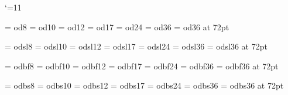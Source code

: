 

%

\catcode`\@=11




\font\od@VIII     = od8
\font\od@X        = od10
\font\od@XII      = od12
\font\od@XVII     = od17
\font\od@XXIV     = od24
\font\od@XXXVI    = od36
\font\od@LXXII    = od36 at 72pt

\font\odsl@VIII   = odsl8
\font\odsl@X      = odsl10
\font\odsl@XII    = odsl12
\font\odsl@XVII   = odsl17
\font\odsl@XXIV   = odsl24
\font\odsl@XXXVI  = odsl36
\font\odsl@LXXII  = odsl36 at 72pt

\font\odbf@VIII   = odbf8
\font\odbf@X      = odbf10
\font\odbf@XII    = odbf12
\font\odbf@XVII   = odbf17
\font\odbf@XXIV   = odbf24
\font\odbf@XXXVI  = odbf36
\font\odbf@LXXII  = odbf36 at 72pt

\font\odbs@VIII   = odbs8
\font\odbs@X      = odbs10
\font\odbs@XII    = odbs12
\font\odbs@XVII   = odbs17
\font\odbs@XXIV   = odbs24
\font\odbs@XXXVI  = odbs36
\font\odbs@LXXII  = odbs36 at 72pt

\def\odVIII{\od@VIII\baselineskip=9pt}
\def\od{\od@X\baselineskip=12pt}
\def\odXII{\od@XII\baselineskip=15pt}
\def\odXVII{\od@XVII\baselineskip=20pt}
\def\odXXIV{\od@XXIV\baselineskip=26pt}
\def\odXXXVI{\od@XXXVI\baselineskip=36pt}
\def\odLXXII{\od@LXXII\baselineskip=72pt}

\def\odslVIII{\odsl@VIII\baselineskip=9pt}
\def\odsl{\odsl@X\baselineskip=12pt}
\def\odslXII{\odsl@XII\baselineskip=15pt}
\def\odslXVII{\odsl@XVII\baselineskip=20pt}
\def\odslXXIV{\odsl@XXIV\baselineskip=26pt}
\def\odslXXXVI{\odsl@XXXVI\baselineskip=36pt}
\def\odslLXXII{\odsl@LXXII\baselineskip=72pt}

\def\odbfVIII{\odbf@VIII\baselineskip=9pt}
\def\odbf{\odbf@X\baselineskip=12pt}
\def\odbfXII{\odbf@XII\baselineskip=15pt}
\def\odbfXVII{\odbf@XVII\baselineskip=20pt}
\def\odbfXXIV{\odbf@XXIV\baselineskip=26pt}
\def\odbfXXXVI{\odbf@XXXVI\baselineskip=36pt}
\def\odbfLXXII{\odbf@LXXII\baselineskip=72pt}

